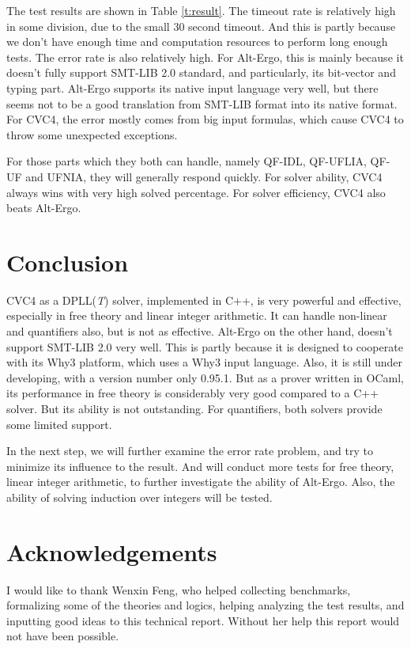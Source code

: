 \documentclass[10pt,twocolumn,letter]{article}
\theoremstyle{definition}
\begin{document}
The test results are shown in Table \ref{t:result}. The timeout rate is relatively high in some division, due to the small 30 second timeout. And this is partly because we don't have enough time and computation resources to perform long enough tests. The error rate is also relatively high. For Alt-Ergo, this is mainly because it doesn't fully support SMT-LIB 2.0 standard, and particularly, its bit-vector and typing part. Alt-Ergo supports its native input language very well, but there seems not to be a good translation from SMT-LIB format into its native format. For CVC4, the error mostly comes from big input formulas, which cause CVC4 to throw some unexpected exceptions.

For those parts which they both can handle, namely QF-IDL, QF-UFLIA, QF-UF and UFNIA, they will generally respond quickly. For solver ability, CVC4 always wins with very high solved percentage. For solver efficiency, CVC4 also beats Alt-Ergo.

\section{Conclusion}

CVC4 as a DPLL({\it T}) solver, implemented in C++, is very powerful and effective, especially in free theory and linear integer arithmetic. It can handle non-linear and quantifiers also, but is not as effective. Alt-Ergo on the other hand, doesn't support SMT-LIB 2.0 very well. This is partly because it is designed to cooperate with its Why3 platform, which uses a Why3 input language. Also, it is still under developing, with a version number only 0.95.1. But as a prover written in OCaml, its performance in free theory is considerably very good compared to a C++ solver. But its ability is not outstanding. For quantifiers, both solvers provide some limited support.

In the next step, we will further examine the error rate problem, and try to minimize its influence to the result. And will conduct more tests for free theory, linear integer arithmetic, to further investigate the ability of Alt-Ergo. Also, the ability of solving induction over integers will be tested.

\section{Acknowledgements}

I would like to thank Wenxin Feng, who helped collecting benchmarks, formalizing some of the theories and logics, helping analyzing the test results, and inputting good ideas to this technical report. Without her help this report would not have been possible.
\end{document}
